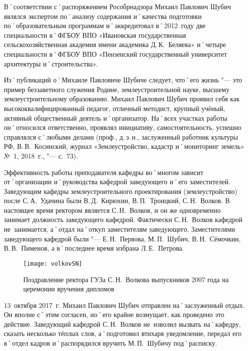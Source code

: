 В˚соответствии с˚распоряжением Рособрнадзора Михаил Павлович Шубич являлся экспертом по˚анализу содержания и˚качества подготовки по˚образовательным программам и˚аккредитовал в˚2012~году две специальности в˚ФГБОУ ВПО «Ивановская государственная сельскохозяйственная академия имени академика Д.\,К.~Беляева» и˚четыре специальности в˚ФГБОУ ВПО «Пензенский государственный университет архитектуры и˚строительства». 

Из˚публикаций о˚Михаиле Павловиче Шубиче следует, что˚его жизнь "--- это пример беззаветного служения Родине, землеустроительной науке, высшему землеустроительному образованию. Михаил Павлович Шубич проявил себя как высококвалифицированный педагог, отличный методист, крупный учёный, активный общественный деятель и˚организатор. На˚всех участках работы он˚относился ответственно, проявлял инициативу, самостоятельность, успешно справлялся с˚любыми делами (проф., д.\,э.\,н., заслуженный работник культуры РФ, В.\,В.~Косинский, журнал «Землеустройство, кадастр и˚мониторинг земель» №~1, 2018~г., "--- с.~73). 

Эффективность работы преподавателя кафедры во˚многом зависит от˚организации и˚руководства кафедрой заведующего и˚его заместителей. Заведующим кафедры землеустроительного проектирования (землеустройство) после С.\,А.~Удачина были В.\,Д.~Кирюхин, В.\,П.~Троицкий, С.\,Н.~Волков. В настоящее время ректором является С.\,Н.~Волков, и он же одновременно занимает должность заведующего кафедрой. Фактически С.\,Н.~Волков кафедрой не~занимается, а˚отдал на˚откуп заместителям заведующего. Заместителями заведующего кафедрой были "---  Е.\,Н.~Первова, М.\,П.~Шубич, В.\,Н.~Сёмочкин, В.\,В.~Пименов, а в˚последнее время избрана Л.\,Е.~Петрова.

\begin{wrapfigure}[15]{O}{.4\textwidth}
\centering
\texttt{[image: volkovSN]}
\caption[Поздравление ректора ГУЗа С.\,Н.~Волкова выпускников 2007 года на церемонии вручения дипломов]{Поздравление ректора ГУЗа С.\,Н.~Волкова выпускников 2007 года на церемонии вручения дипломов\footnotemark}
\label{fig:volkovSN}
\end{wrapfigure}

13~октября 2017~г. Михаил Павлович Шубич отправлен на˚заслуженный отдых. Он вполне с˚этим согласен, но˚его крайне возмущает, как проведено это действие. Заведующий кафедрой С.\,Н.~Волков не~изволил вызвать на˚кафедру, сказать несколько тёплых слов, а˚подготовил втихаря уведомление, передал его в˚отдел кадров и˚распорядился вручить М.\,П.~Шубичу под˚расписку.

